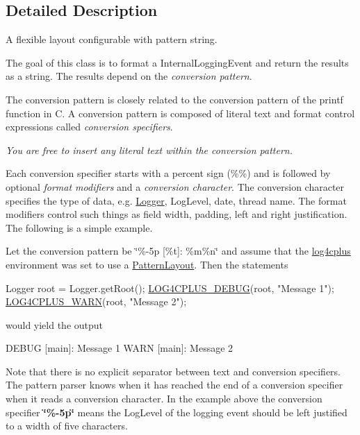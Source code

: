\subsection{Detailed Description}
A flexible layout configurable with pattern string.

The goal of this class is to format a Internal\-Logging\-Event and return the results as a string. The results depend on the {\itshape conversion pattern}.

The conversion pattern is closely related to the conversion pattern of the printf function in C. A conversion pattern is composed of literal text and format control expressions called {\itshape conversion specifiers}.

{\itshape You are free to insert any literal text within the conversion pattern.}

Each conversion specifier starts with a percent sign (\%\%) and is followed by optional {\itshape format modifiers} and a {\itshape conversion character}. The conversion character specifies the type of data, e.\-g. \hyperlink{classlog4cplus_1_1Logger}{Logger}, Log\-Level, date, thread name. The format modifiers control such things as field width, padding, left and right justification. The following is a simple example.

Let the conversion pattern be {\ttfamily \char`\"{}\%-\/5p \mbox{[}\%t\mbox{]}\-: \%m\%n\char`\"{}} and assume that the \hyperlink{namespacelog4cplus}{log4cplus} environment was set to use a \hyperlink{classlog4cplus_1_1PatternLayout}{Pattern\-Layout}. Then the statements


\begin{DoxyCode}
Logger root = Logger.getRoot();
\hyperlink{loggingmacros_8h_a974c0d646aced4efa1fa183beae0613a}{LOG4CPLUS\_DEBUG}(root, \textcolor{stringliteral}{"Message 1"});
\hyperlink{loggingmacros_8h_a724e4ac593ef8ec7662f65f3a2ba5c52}{LOG4CPLUS\_WARN}(root, \textcolor{stringliteral}{"Message 2"});
\end{DoxyCode}


would yield the output


\begin{DoxyCode}
DEBUG [main]: Message 1
WARN  [main]: Message 2
\end{DoxyCode}


Note that there is no explicit separator between text and conversion specifiers. The pattern parser knows when it has reached the end of a conversion specifier when it reads a conversion character. In the example above the conversion specifier {\bfseries \char`\"{}\%-\/5p\char`\"{}} means the Log\-Level of the logging event should be left justified to a width of five characters.


